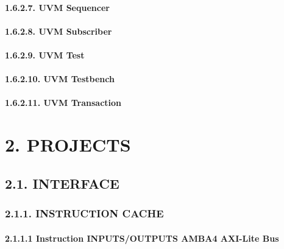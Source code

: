 \documentclass[
]{article}
\begin{document}
\hypertarget{uvm-sequencer}{%
\paragraph{1.6.2.7. UVM Sequencer}\label{uvm-sequencer}}

\hypertarget{uvm-subscriber}{%
\paragraph{1.6.2.8. UVM Subscriber}\label{uvm-subscriber}}

\hypertarget{uvm-test}{%
\paragraph{1.6.2.9. UVM Test}\label{uvm-test}}

\hypertarget{uvm-testbench}{%
\paragraph{1.6.2.10. UVM Testbench}\label{uvm-testbench}}

\hypertarget{uvm-transaction}{%
\paragraph{1.6.2.11. UVM Transaction}\label{uvm-transaction}}

\hypertarget{projects}{%
\section{2. PROJECTS}\label{projects}}

\hypertarget{interface}{%
\subsection{2.1. INTERFACE}\label{interface}}

\hypertarget{instruction-cache}{%
\subsubsection{2.1.1. INSTRUCTION CACHE}\label{instruction-cache}}

\hypertarget{instruction-inputsoutputs-amba4-axi-lite-bus}{%
\paragraph{2.1.1.1 Instruction INPUTS/OUTPUTS AMBA4 AXI-Lite
Bus}\label{instruction-inputsoutputs-amba4-axi-lite-bus}}
\end{document}
